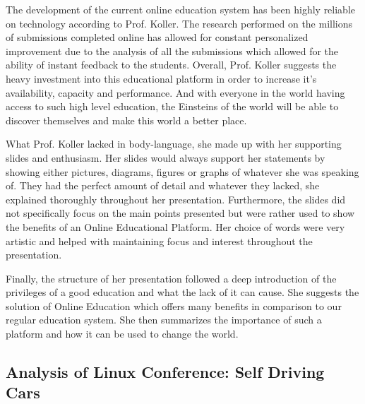 \documentclass[12pt]{article}
\begin{document}
\vspace{2.5mm} %

    The development of the current online education system has been highly reliable on technology according to Prof. Koller. The research performed on the millions of submissions completed online has allowed for constant personalized improvement due to the analysis of all the submissions which allowed for the ability of instant feedback to the students. Overall, Prof. Koller suggests the heavy investment into this educational platform in order to increase it's availability, capacity and performance. And with everyone in the world having access to such high level education, the Einsteins of the world will be able to discover themselves and make this world a better place.

\vspace{2.5mm} %

    What Prof. Koller lacked in body-language, she made up with her supporting slides and enthusiasm. Her slides would always support her statements by showing either pictures, diagrams, figures or graphs of whatever she was speaking of. They had the perfect amount of detail and whatever they lacked, she explained thoroughly throughout her presentation. Furthermore, the slides did not specifically focus on the main points presented but were rather used to show the benefits of an Online Educational Platform. Her choice of words were very artistic and helped with maintaining focus and interest throughout the presentation.
    
\vspace{2.5mm} %

    Finally, the structure of her presentation followed a deep introduction of the privileges of a good education and what the lack of it can cause. She suggests the solution of Online Education which offers many benefits in comparison to our regular education system. She then summarizes the importance of such a platform and how it can be used to change the world.
    
\vspace{2.5mm} %

\newpage

\subsection*{Analysis of Linux Conference: Self Driving Cars}
\vspace{5mm} %
\end{document}
